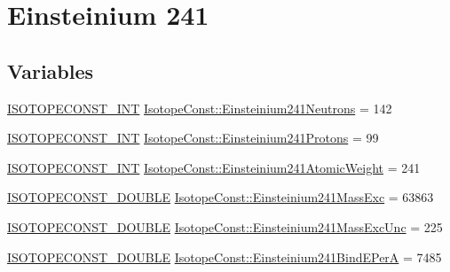\hypertarget{group___isotope_const-_einsteinium-_es241}{}\section{Einsteinium 241}
\label{group___isotope_const-_einsteinium-_es241}
\subsection*{Variables}
\begin{DoxyCompactItemize}
\item 
\mbox{\hyperlink{group___isotope_const-_macros_ga5f18360b3e99483a35c32d789e62621c}{I\+S\+O\+T\+O\+P\+E\+C\+O\+N\+S\+T\+\_\+\+I\+NT}} \mbox{\hyperlink{group___isotope_const-_einsteinium-_es241_gaf6a69d5a0b8b65a4b7994261f7a9a894}{Isotope\+Const\+::\+Einsteinium241\+Neutrons}} = 142
\item 
\mbox{\hyperlink{group___isotope_const-_macros_ga5f18360b3e99483a35c32d789e62621c}{I\+S\+O\+T\+O\+P\+E\+C\+O\+N\+S\+T\+\_\+\+I\+NT}} \mbox{\hyperlink{group___isotope_const-_einsteinium-_es241_gaf6e15aed103b89e62cdc5af366b537e9}{Isotope\+Const\+::\+Einsteinium241\+Protons}} = 99
\item 
\mbox{\hyperlink{group___isotope_const-_macros_ga5f18360b3e99483a35c32d789e62621c}{I\+S\+O\+T\+O\+P\+E\+C\+O\+N\+S\+T\+\_\+\+I\+NT}} \mbox{\hyperlink{group___isotope_const-_einsteinium-_es241_gac3680f0d8534521733a6545f8fd40b84}{Isotope\+Const\+::\+Einsteinium241\+Atomic\+Weight}} = 241
\item 
\mbox{\hyperlink{group___isotope_const-_macros_ga8f45a7272ce02c0b4c65c44636ed719a}{I\+S\+O\+T\+O\+P\+E\+C\+O\+N\+S\+T\+\_\+\+D\+O\+U\+B\+LE}} \mbox{\hyperlink{group___isotope_const-_einsteinium-_es241_gacf3f7323545ec59f8279b7d8a196221c}{Isotope\+Const\+::\+Einsteinium241\+Mass\+Exc}} = 63863
\item 
\mbox{\hyperlink{group___isotope_const-_macros_ga8f45a7272ce02c0b4c65c44636ed719a}{I\+S\+O\+T\+O\+P\+E\+C\+O\+N\+S\+T\+\_\+\+D\+O\+U\+B\+LE}} \mbox{\hyperlink{group___isotope_const-_einsteinium-_es241_ga73e4be2d22c28666ce14421e65804692}{Isotope\+Const\+::\+Einsteinium241\+Mass\+Exc\+Unc}} = 225
\item 
\mbox{\hyperlink{group___isotope_const-_macros_ga8f45a7272ce02c0b4c65c44636ed719a}{I\+S\+O\+T\+O\+P\+E\+C\+O\+N\+S\+T\+\_\+\+D\+O\+U\+B\+LE}} \mbox{\hyperlink{group___isotope_const-_einsteinium-_es241_ga2483653779a88902aa0848953613b377}{Isotope\+Const\+::\+Einsteinium241\+Bind\+E\+PerA}} = 7485
\item 

\end{DoxyCompactItemize}
